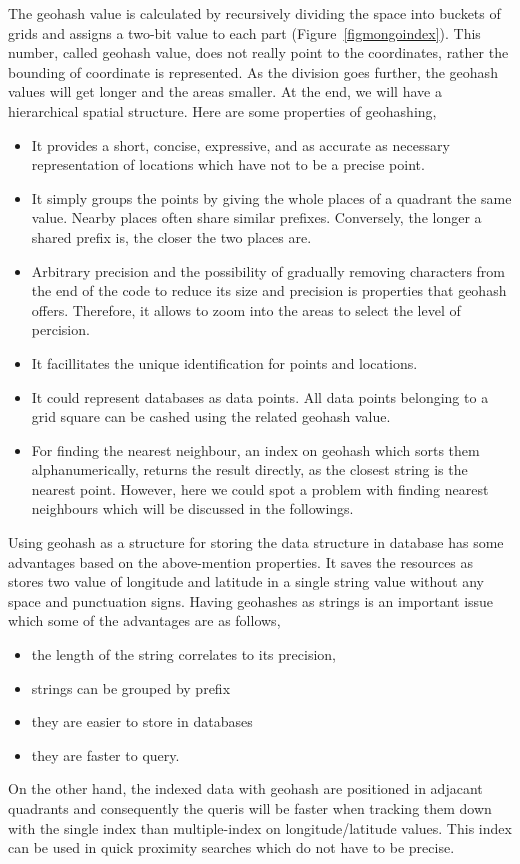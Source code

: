 \documentclass[a4paper,12pt]{article}
\begin{document}
The geohash value is calculated by recursively dividing the space into buckets of grids and assigns a two-bit value to each part (Figure~\ref{figmongoindex}). This number, called geohash value, does not really point to the coordinates, rather the bounding of coordinate is represented. 
As the division goes further, the geohash values will get longer and the areas smaller. 
At the end, we will have a hierarchical spatial structure. Here are some properties of geohashing,
\begin{itemize}
\item It provides a short, concise, expressive, and as accurate as necessary representation of locations which have not to be a precise point.
\item It simply groups the points by giving the whole places of a quadrant the same value. Nearby places often share similar prefixes. Conversely, the longer a shared prefix is, the closer the two places are. 
\item Arbitrary precision and the possibility of gradually removing characters from the end of the code to reduce its size and precision is properties that geohash offers. Therefore, it allows to zoom into the areas to select the level of percision.
\item It facillitates the unique identification for points and locations.
\item It could represent databases as data points. All data points belonging to a grid square can be cashed using the related geohash value.
\item For finding the nearest neighbour, an index on geohash which sorts them alphanumerically, returns the result directly, as the closest string is the nearest point. However, here we could spot a problem with finding nearest neighbours which will be discussed in the followings.
\end{itemize}

Using geohash as a structure for storing the data structure in database has some advantages based on the above-mention properties. It saves the resources as stores two value of longitude and latitude in a single string value without any space and punctuation signs. 
Having geohashes as strings is an important issue which some of the advantages are as follows, 
\begin{itemize}
\item the length of the string correlates to its precision,
\item strings can be grouped by prefix
\item  they are easier to store in databases
\item  they are faster to query. 
\end{itemize}
On the other hand, the indexed data with geohash are positioned in adjacant quadrants and consequently the queris will be faster when tracking them down with the single index than multiple-index on longitude/latitude values. This index can be used in quick proximity searches which do not have to be precise.
\end{document}
